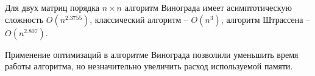 Для двух матриц порядка $n \times n$ алгоритм Винограда имеет асимптотическую сложность $O(n^{2.3755})$, классический алгоритм -- $O(n^3)$, алгоритм Штрассена -- $O(n^{2.807})$.

Применение оптимизаций в алгоритме Винограда позволили уменьшить время работы алгоритма, но незначительно увеличить расход используемой памяти.

